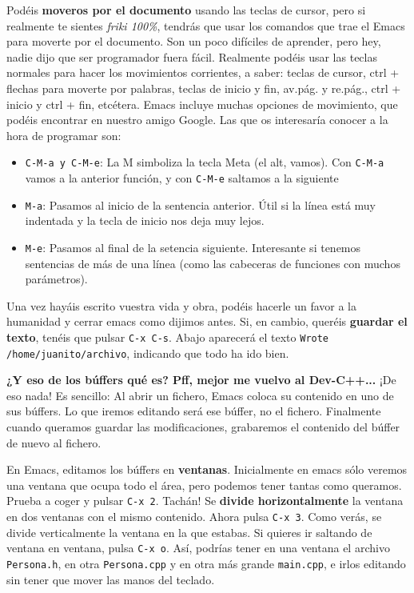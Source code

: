 \documentclass{article}
\begin{document}
Podéis \textbf{moveros por el documento} usando las teclas de cursor, pero si realmente te sientes \textit{friki 100\%}, tendrás que usar los comandos que trae el Emacs para moverte por el documento. Son un poco difíciles de aprender, pero hey, nadie dijo que ser programador fuera fácil. Realmente podéis usar las teclas normales para hacer los movimientos corrientes, a saber: teclas de cursor, ctrl + flechas para moverte por palabras, teclas de inicio y fin, av.pág. y re.pág., ctrl + inicio y ctrl + fin, etcétera. Emacs incluye muchas opciones de movimiento, que podéis encontrar en nuestro amigo Google. Las que os interesaría conocer a la hora de programar son:
\vspace{-0.5cm}
\begin{itemize}
 \item \texttt{C-M-a y C-M-e}: La M simboliza la tecla Meta (el alt, vamos). Con \texttt{C-M-a} vamos a la anterior función, y con \texttt{C-M-e} saltamos a la siguiente
\item \texttt{M-a}: Pasamos al inicio de la sentencia anterior. Útil si la línea está muy indentada y la tecla de inicio nos deja muy lejos.
\item \texttt{M-e}: Pasamos al final de la setencia siguiente. Interesante si tenemos sentencias de más de una línea (como las cabeceras de funciones con muchos parámetros).
\end{itemize}

Una vez hayáis escrito vuestra vida y obra, podéis hacerle un favor a la humanidad y cerrar emacs como dijimos antes. Si, en cambio, queréis \textbf{guardar el texto}, tenéis que pulsar \texttt{C-x C-s}. Abajo aparecerá el texto \texttt{Wrote /home/juanito/archivo}, indicando que todo ha ido bien.

\textbf{¿Y eso de los búffers qué es? Pff, mejor me vuelvo al Dev-C++...} ¡De eso nada! Es sencillo: Al abrir un fichero, Emacs coloca su contenido en uno de sus búffers. Lo que iremos editando será ese búffer, no el fichero. Finalmente cuando queramos guardar las modificaciones, grabaremos el contenido del búffer de nuevo al fichero.

En Emacs, editamos los búffers en \textbf{ventanas}. Inicialmente en emacs sólo veremos una ventana que ocupa todo el área, pero podemos tener tantas como queramos. Prueba a coger y pulsar \texttt{C-x 2}. Tachán! Se \textbf{divide horizontalmente} la ventana en dos ventanas con el mismo contenido. Ahora pulsa \texttt{C-x 3}. Como verás, se divide verticalmente la ventana en la que estabas. Si quieres ir saltando de ventana en ventana, pulsa \texttt{C-x o}. Así, podrías tener en una ventana el archivo \texttt{Persona.h}, en otra \texttt{Persona.cpp} y en otra más grande \texttt{main.cpp}, e irlos editando sin tener que mover las manos del teclado.
\end{document}
